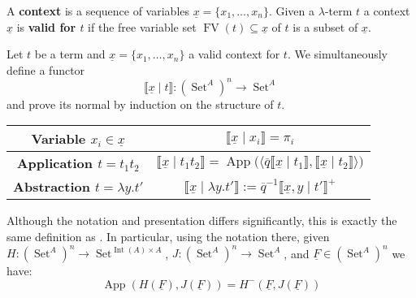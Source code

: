 \documentclass[runningheads]{llncs}
\newcommand{\lto}{\longrightarrow}
\DeclareMathOperator{\set}{Set}
\begin{document}
\begin{definition}\label{def:context}
		A \textbf{context} is a sequence of variables $\underline{x} = \{ x_1, \ldots, x_n \}$. Given a $\lambda$-term $t$ a context $\underline{x}$ is \textbf{valid for $t$} if the free variable set $\operatorname{FV}(t) \subseteq \underline{x}$ of $t$ is a subset of $\underline{x}$.
	\end{definition}

\begin{definition}\label{def:functor_model}
    Let $t$ be a term and $\underline{x} = \{x_1, \ldots, x_n\}$ a valid context for $t$. We simultaneously define a functor
    \begin{equation}
        \llbracket \underline{x} \mid t \rrbracket: (\set^A)^n \lto \set^A
    \end{equation}
    and prove its normal by induction on the structure of $t$.
    \begin{center}
			\begin{tabular}{ | c | c | }
			\hline
				\textbf{Variable $x_i \in \underline{x}$} & 
				$\llbracket \underline{x} \mid x_i \rrbracket = \pi_i$\\
				\hline
\textbf{Application $t = t_1 t_2$} & $\llbracket \underline{x} \mid t_1t_2\rrbracket = \operatorname{App}\big( \langle \overline{q} \llbracket \underline{x} \mid t_1 \rrbracket, \llbracket \underline{x} \mid t_2 \rrbracket \rangle \big)$\\
\hline
\textbf{Abstraction $t = \lambda y. t'$} & $\llbracket \underline{x} \mid \lambda y. t' \rrbracket := \overline{q}^{-1} \llbracket \underline{x}, y \mid t' \rrbracket^+$\\
\hline
			\end{tabular}
		\end{center}
\end{definition}

\begin{remark}
    Although the notation and presentation differs significantly, this is exactly the same definition as \cite[The model $A_\infty$]{Girard}. In particular, using the notation there, given $H: (\set^A)^n \lto \set^{\operatorname{Int}(A) \times A}$, $J: (\set^A)^n \lto \set^A$, and $\underline{F} \in (\set^A)^n$ we have:
    \begin{equation}
        \operatorname{App}(H(\underline{F}), J(\underline{F})) = H^-(\underline{F}, J(\underline{F}))
    \end{equation}
\end{remark}
\end{document}
